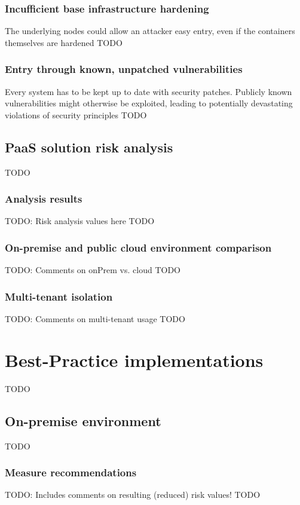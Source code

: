 \subsection{Incufficient base infrastructure hardening}
The underlying nodes could allow an attacker easy entry, even if the containers themselves are hardened
TODO

\subsection{Entry through known, unpatched vulnerabilities}
Every system has to be kept up to date with  security patches. Publicly known vulnerabilities might otherwise be exploited, leading to potentially devastating violations of security principles
TODO

\section{PaaS solution risk analysis}
TODO

\subsection{Analysis results}
TODO: Risk analysis values here
TODO

\subsection{On-premise and public cloud environment comparison}
TODO: Comments on onPrem vs. cloud
TODO

\subsection{Multi-tenant isolation}
TODO: Comments on multi-tenant usage
TODO

\chapter{Best-Practice implementations}
TODO

\section{On-premise environment}
TODO

\subsection{Measure recommendations}
TODO: Includes comments on resulting (reduced) risk values!
TODO


